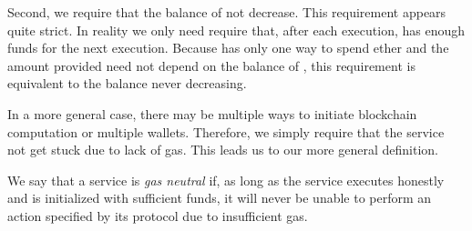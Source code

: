 Second, we require that the balance of \tcadd not decrease.
This requirement appears quite strict.
In reality we only need require that, after each execution, \tc has enough funds for the next execution.
Because \tc has only one way to spend ether and the amount provided need not depend on the balance of \tcadd,
this requirement is equivalent to the balance never decreasing.

In a more general case, there may be multiple ways to initiate blockchain computation or multiple wallets.
Therefore, we simply require that the service not get stuck due to lack of gas.
This leads us to our more general definition.

\begin{definition}
  \label{def:gas-neutrality}
  We say that a service is \emph{gas neutral} if, as long as the service executes honestly and is initialized with sufficient funds,
  it will never be unable to perform an action specified by its protocol due to insufficient gas.
\end{definition}

